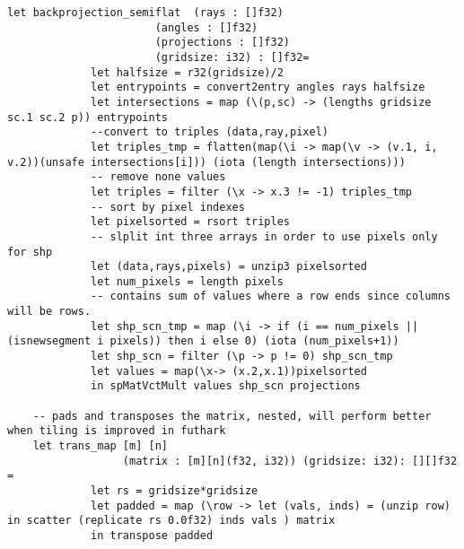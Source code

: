 \begin{lstlisting}[language=Futhark]
    let backprojection_semiflat  (rays : []f32)
                       (angles : []f32)
                       (projections : []f32)
                       (gridsize: i32) : []f32=
             let halfsize = r32(gridsize)/2
             let entrypoints = convert2entry angles rays halfsize
             let intersections = map (\(p,sc) -> (lengths gridsize sc.1 sc.2 p)) entrypoints
             --convert to triples (data,ray,pixel)
             let triples_tmp = flatten(map(\i -> map(\v -> (v.1, i, v.2))(unsafe intersections[i])) (iota (length intersections)))
             -- remove none values
             let triples = filter (\x -> x.3 != -1) triples_tmp
             -- sort by pixel indexes
             let pixelsorted = rsort triples
             -- slplit int three arrays in order to use pixels only for shp
             let (data,rays,pixels) = unzip3 pixelsorted
             let num_pixels = length pixels
             -- contains sum of values where a row ends since columns will be rows.
             let shp_scn_tmp = map (\i -> if (i == num_pixels || (isnewsegment i pixels)) then i else 0) (iota (num_pixels+1))
             let shp_scn = filter (\p -> p != 0) shp_scn_tmp
             let values = map(\x-> (x.2,x.1))pixelsorted
             in spMatVctMult values shp_scn projections

    -- pads and transposes the matrix, nested, will perform better when tiling is improved in futhark
    let trans_map [m] [n]
                  (matrix : [m][n](f32, i32)) (gridsize: i32): [][]f32 =
             let rs = gridsize*gridsize
             let padded = map (\row -> let (vals, inds) = (unzip row) in scatter (replicate rs 0.0f32) inds vals ) matrix
             in transpose padded


\end{lstlisting}

